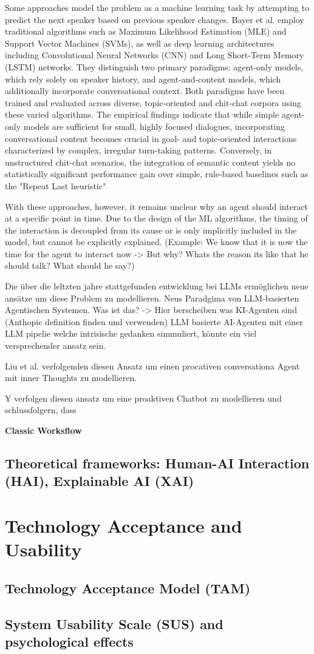 Some approaches model the problem as a machine learning task by attempting to predict the next speaker based
on previous speaker changes.
\cite{bayserLearningMultiPartyTurnTaking2019}
Bayer et al. employ traditional algorithms such as Maximum Likelihood Estimation (MLE) and Support Vector
Machines (SVMs), as well as deep learning architectures including Convolutional Neural Networks (CNN) and
Long Short-Term Memory (LSTM) networks. They distinguish two primary paradigms: agent-only
models, which rely solely on speaker history, and agent-and-content models, which additionally incorporate
conversational context. Both paradigms have been trained and evaluated across diverse, topic-oriented and
chit-chat corpora using these varied algorithms.
The empirical findings indicate that while simple agent-only models are sufficient for small, highly focused
dialogues, incorporating conversational content becomes crucial in goal- and topic-oriented interactions
characterized by complex, irregular turn-taking patterns. Conversely, in unstructured chit-chat scenarios,
the integration of semantic content yields no statistically
significant performance gain over simple, rule-based baselines such as the "Repeat Last heuristic"
\cite[p. 2]{bayserLearningMultiPartyTurnTaking2019}

With these approaches, however, it remains unclear why an agent should interact at a specific point in time.
Due to the design of the ML algorithms, the timing of the interaction is decoupled from its cause or is only
implicitly included in the model, but cannot be explicitly explained. (Example: We know that it is now the
time for the agent to interact now -> But why? Whats the reason its like that he should talk? What should he say?)

Die über die leltzten jahre stattgefunden entwicklung bei LLMs ermöglichen neue ansätze um diese Problem zu modellieren.
Neus Paradgima von LLM-basierten Agentischen Systemen.
Was ist das? -> Hier berscheiben was KI-Agenten sind (Anthopic definition finden und verwenden)
LLM basierte AI-Agenten mit einer LLM pipelie welche intrisische gedanken simmuliert, könnte ein viel
versprechender ansatz sein.

Liu et al. verfolgenden diesen Ansatz um einen procativen conversationa Agent mit inner Thoughts zu
modellieren. \cite{liuProactiveConversationalAgents2025}

Y verfolgen diesen ansatz um eine proaktiven Chatbot zu modellieren und
schlussfolgern, dass

\textbf{Classic Worksflow}

\subsection{Theoretical frameworks: Human-AI Interaction (HAI), Explainable AI (XAI) }
\section{Technology Acceptance and Usability}
\subsection{Technology Acceptance Model (TAM)}
\subsection{System Usability Scale (SUS) and psychological effects}
